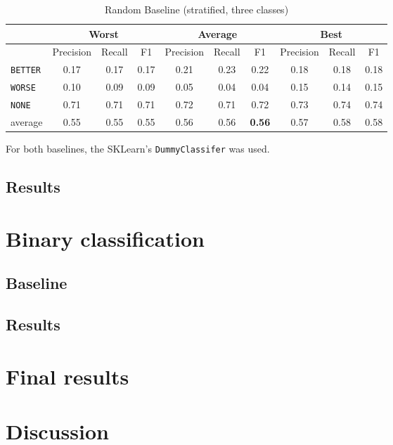  \begin{table}[h]
                \centering
\caption{ Random Baseline (stratified, three classes) }
\label{tbl:random_baseline}
 \begin{tabular}{@{}lccccccccc@{}}
              \toprule
               & \multicolumn{3}{c}{Worst} & \multicolumn{3}{c}{Average} & \multicolumn{3}{c}{Best}  \\ \midrule
               & Precision  & Recall & F1   & Precision  & Recall  & F1    & Precision & Recall & F1   \\ \toprule
\texttt{BETTER}	 & 0.17	 & 0.17	 & 0.17	 &0.21	 & 0.23	 & 0.22	 &0.18	 & 0.18	 & 0.18	 \\ 
\texttt{WORSE}	 & 0.10	 & 0.09	 & 0.09	 &0.05	 & 0.04	 & 0.04	 &0.15	 & 0.14	 & 0.15	 \\ 
\texttt{NONE}	 & 0.71	 & 0.71	 & 0.71	 &0.72	 & 0.71	 & 0.72	 &0.73	 & 0.74	 & 0.74	 \\ \midrule 
average	 & 0.55	 & 0.55	 & 0.55	 &0.56	 & 0.56	 & \textbf{0.56}	 &0.57	 & 0.58	 & 0.58	 \\ \bottomrule

    \end{tabular}
\end{table}

For both baselines, the SKLearn's \texttt{DummyClassifer} was used.
\subsection{Results}

\section{Binary classification}
\subsection{Baseline}
\subsection{Results}

\section{Final results}
\label{sec:final}

\section{Discussion}